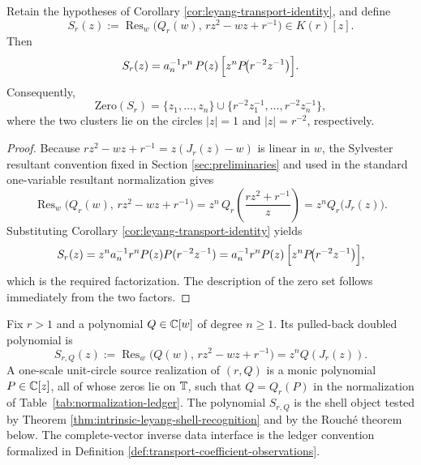 \begin{corollary}\label{cor:leyang-double-resultant}
Retain the hypotheses of Corollary \ref{cor:leyang-transport-identity}, and define
\[
S_r(z):=\operatorname{Res}_w\!\bigl(Q_r(w),\,r z^2-w z+r^{-1}\bigr)\in K(r)[z].
\]
Then
\[
S_r(z)=a_n^{-1} r^{n}\,P(z)\,\Bigl[z^{n}P\!\bigl(r^{-2}z^{-1}\bigr)\Bigr].
\]
Consequently,
\[
\mathrm{Zero}(S_r)
=\{z_1,\dots,z_n\}\cup\{r^{-2}z_1^{-1},\dots,r^{-2}z_n^{-1}\},
\]
where the two clusters lie on the circles \(|z|=1\) and \(|z|=r^{-2}\), respectively.
\end{corollary}

\begin{proof}
Because \(r z^2-w z+r^{-1}=z(J_r(z)-w)\) is linear in \(w\), the Sylvester resultant convention fixed in Section \ref{sec:preliminaries} and used in the standard one-variable resultant normalization \citep[Chap.~12]{GKZ1994} gives
\[
\operatorname{Res}_w\!\bigl(Q_r(w),\,r z^2-w z+r^{-1}\bigr)
=z^n\,Q_r\!\left(\frac{r z^2+r^{-1}}{z}\right)
=z^n Q_r\!\bigl(J_r(z)\bigr).
\]
Substituting Corollary \ref{cor:leyang-transport-identity} yields
\[
S_r(z)=z^n a_n^{-1}r^n P(z)P(r^{-2}z^{-1})
=a_n^{-1}r^{n}P(z)\,\Bigl[z^{n}P\!\bigl(r^{-2}z^{-1}\bigr)\Bigr],
\]
which is the required factorization. The description of the zero set follows immediately from the two factors.
\end{proof}


\begin{definition}\label{def:noiseless-leyang-inverse-data}
Fix \(r>1\) and a polynomial \(Q\in\mathbb{C}[w]\) of degree \(n\ge1\).  Its pulled-back doubled polynomial is
\[
S_{r,Q}(z):=\operatorname{Res}_w\!\bigl(Q(w),\,r z^2-w z+r^{-1}\bigr)=z^nQ(J_r(z)).
\]
A one-scale unit-circle source realization of \((r,Q)\) is a monic polynomial \(P\in\mathbb{C}[z]\), all of whose zeros lie on \(\mathbb{T}\), such that \(Q=Q_r(P)\) in the normalization of Table~\ref{tab:normalization-ledger}.  The polynomial \(S_{r,Q}\) is the shell object tested by Theorem \ref{thm:intrinsic-leyang-shell-recognition} and by the Rouch\'e theorem below.  The complete-vector inverse data interface is the ledger convention formalized in Definition \ref{def:transport-coefficient-observations}.
\end{definition}


